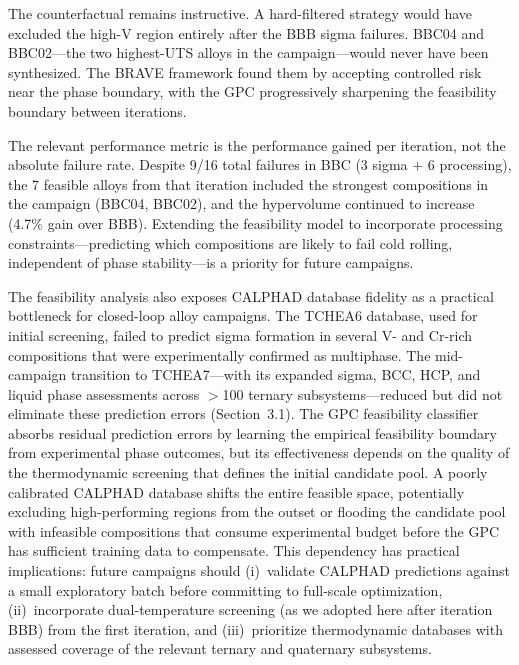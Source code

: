 \documentclass[preprint,12pt,times]{elsarticle}  %
\begin{document}
The counterfactual remains instructive. A hard-filtered strategy would have excluded the high-V region entirely after the BBB sigma failures. BBC04 and BBC02---the two highest-UTS alloys in the campaign---would never have been synthesized. The BRAVE framework found them by accepting controlled risk near the phase boundary, with the GPC progressively sharpening the feasibility boundary between iterations.

The relevant performance metric is the performance gained per iteration, not the absolute failure rate. Despite 9/16 total failures in BBC (3 sigma + 6 processing), the 7 feasible alloys from that iteration included the strongest compositions in the campaign (BBC04, BBC02), and the hypervolume continued to increase (4.7\% gain over BBB). Extending the feasibility model to incorporate processing constraints---predicting which compositions are likely to fail cold rolling, independent of phase stability---is a priority for future campaigns.

The feasibility analysis also exposes CALPHAD database fidelity as a practical bottleneck for closed-loop alloy campaigns. The TCHEA6 database, used for initial screening, failed to predict sigma formation in several V- and Cr-rich compositions that were experimentally confirmed as multiphase. The mid-campaign transition to TCHEA7---with its expanded sigma, BCC, HCP, and liquid phase assessments across $>$100 ternary subsystems---reduced but did not eliminate these prediction errors (Section~3.1). The GPC feasibility classifier absorbs residual prediction errors by learning the empirical feasibility boundary from experimental phase outcomes, but its effectiveness depends on the quality of the thermodynamic screening that defines the initial candidate pool. A poorly calibrated CALPHAD database shifts the entire feasible space, potentially excluding high-performing regions from the outset or flooding the candidate pool with infeasible compositions that consume experimental budget before the GPC has sufficient training data to compensate. This dependency has practical implications: future campaigns should (i)~validate CALPHAD predictions against a small exploratory batch before committing to full-scale optimization, (ii)~incorporate dual-temperature screening (as we adopted here after iteration BBB) from the first iteration, and (iii)~prioritize thermodynamic databases with assessed coverage of the relevant ternary and quaternary subsystems.

\end{document}
